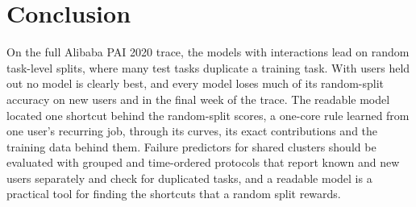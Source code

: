\section{Conclusion}
\label{sec:conclusion}

On the full Alibaba PAI 2020 trace, the models with interactions lead on random task-level splits, where many test tasks duplicate a training task. With users held out no model is clearly best, and every model loses much of its random-split accuracy on new users and in the final week of the trace. The readable model located one shortcut behind the random-split scores, a one-core rule learned from one user's recurring job, through its curves, its exact contributions and the training data behind them. Failure predictors for shared clusters should be evaluated with grouped and time-ordered protocols that report known and new users separately and check for duplicated tasks, and a readable model is a practical tool for finding the shortcuts that a random split rewards.
